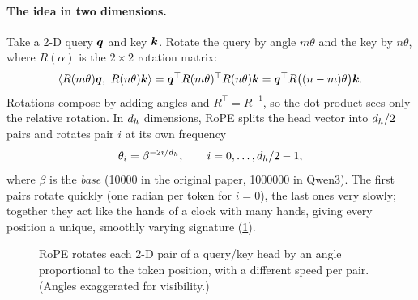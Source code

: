 \paragraph{The idea in two dimensions.}
Take a 2-D query $\bm{q}$ and key $\bm{k}$. Rotate the query by angle $m\theta$ and the key by
$n\theta$, where $R(\alpha)$ is the $2\times2$ rotation matrix:
\begin{equation}
\langle R(m\theta)\bm{q},\ R(n\theta)\bm{k}\rangle = \bm{q}^\top R(m\theta)^\top R(n\theta)\bm{k}
= \bm{q}^\top R\big((n-m)\theta\big)\bm{k} .
\label{eq:modern:roperel}
\end{equation}
Rotations compose by adding angles and $R^\top=R^{-1}$, so the dot product sees only the relative
rotation. In $d_{h}$ dimensions, RoPE splits the head vector into $d_{h}/2$ pairs and rotates pair
$i$ at its own frequency
\begin{equation}
\theta_i = \beta^{-2i/d_{h}},\qquad i=0,\ldots,d_{h}/2-1,
\label{eq:modern:ropefreq}
\end{equation}
where $\beta$ is the \emph{base} (\num{10000} in the original paper, \num{1000000} in Qwen3). The first
pairs rotate quickly (one radian per token for $i=0$), the last ones very slowly; together they act
like the hands of a clock with many hands, giving every position a unique, smoothly varying signature
(\cref{fig:modern:ropeclock}).

\begin{figure}[t]
\centering
{}
\caption{RoPE rotates each 2-D pair of a query/key head by an angle proportional to the token
position, with a different speed per pair. (Angles exaggerated for visibility.)}
\label{fig:modern:ropeclock}
\end{figure}

